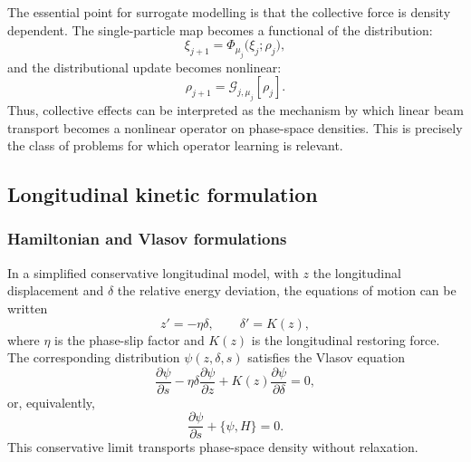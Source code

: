 \documentclass[11pt,a4paper]{article}
\begin{document}
\begin{sloppypar}
The essential point for surrogate modelling is that the collective force is density dependent. The single-particle map becomes a functional of the distribution:
\begin{equation}
    \xi_{j+1}=\Phi_{\mu_j}\big(\xi_j;\rho_j\big),
    \label{eq:density_dependent_map}
\end{equation}
and the distributional update becomes nonlinear:
\begin{equation}
    \rho_{j+1}=\mathcal{G}_{j,\mu_j}[\rho_j].
    \label{eq:nonlinear_distribution_update}
\end{equation}
Thus, collective effects can be interpreted as the mechanism by which linear beam transport becomes a nonlinear operator on phase-space densities. This is precisely the class of problems for which operator learning is relevant.

\subsection{Longitudinal kinetic formulation}
\subsubsection{Hamiltonian and Vlasov formulations}
In a simplified conservative longitudinal model, with $z$ the longitudinal displacement and $\delta$ the relative energy deviation, the equations of motion can be written
\begin{equation}
    z'=-\eta\delta,\qquad \delta'=K(z),
    \label{eq:longitudinal_motion}
\end{equation}
where $\eta$ is the phase-slip factor and $K(z)$ is the longitudinal restoring force. The corresponding distribution $\psi(z,\delta,s)$ satisfies the Vlasov equation
\begin{equation}
    \frac{\partial \psi}{\partial s}
    -\eta\delta\frac{\partial \psi}{\partial z}
    +K(z)\frac{\partial \psi}{\partial \delta}=0,
    \label{eq:vlasov_main}
\end{equation}
or, equivalently,
\begin{equation}
    \frac{\partial \psi}{\partial s}+\{\psi,H\}=0.
    \label{eq:vlasov_hamiltonian_main}
\end{equation}
This conservative limit transports phase-space density without relaxation.


\end{sloppypar}
\end{document}
